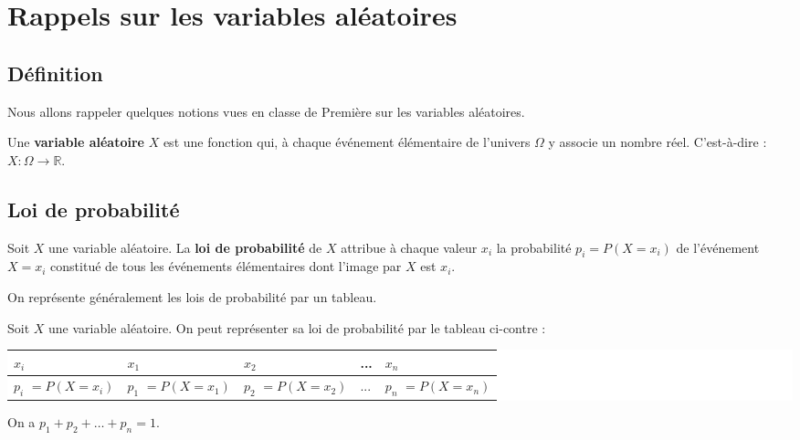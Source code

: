 



	\section{Rappels sur les variables aléatoires}

	\subsection{Définition}

	Nous allons rappeler quelques notions vues en classe de Première sur les variables aléatoires.

	\begin{formula}[Définition]
		Une \textbf{variable aléatoire} $X$ est une fonction qui, à chaque événement élémentaire de l'univers $\Omega$ y associe un nombre réel. C'est-à-dire : $X : \Omega \rightarrow \mathbb{R}$.
	\end{formula}

	\subsection{Loi de probabilité}

	\begin{formula}[Définition]
		Soit $X$ une variable aléatoire. La \textbf{loi de probabilité} de $X$ attribue à chaque valeur $x_i$ la probabilité $p_i = P(X = x_i)$ de l'événement $X = x_i$ constitué de tous les événements élémentaires dont l'image par $X$ est $x_i$.
	\end{formula}

	On représente généralement les lois de probabilité par un tableau.

	\begin{formula}
		Soit $X$ une variable aléatoire. On peut représenter sa loi de probabilité par le tableau ci-contre :
		\newpar
		\colorbox{white}{%
			\begin{tabularx}{\textwidth}{|X|X|X|X|X|}
				\hline
				$x_i$ & $x_1$ & $x_2$ & ... & $x_n$ \\
				\hline
				$p_i$ \newline $=P(X = x_i)$ & $p_1$ \newline $= P(X = x_1)$ & $p_2$ \newline $= P(X = x_2)$ & ... & $p_n$ \newline $= P(X = x_n)$ \\
				\hline
			\end{tabularx}%
		}
		\newpar
		On a $p_1 + p_2 + \dots + p_n = 1$.
	\end{formula}

